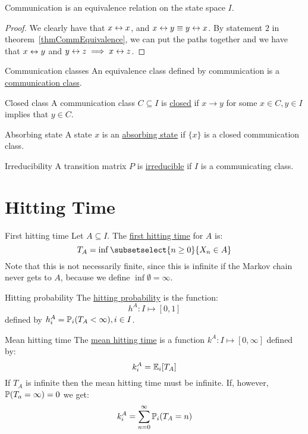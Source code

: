\documentclass[../Main.tex]{subfiles}
\begin{document}
\begin{corollary}
    Communication is an equivalence relation on the state space $I$.
    \label{corCommEquivalence}
\end{corollary}
\begin{proof}
    We clearly have that $x \comms x$, and $x \comms y \equiv y \comms x$. By statement $2$ in theorem~\ref{thmCommEquivalence}, we can put the paths together and we have that $x \comms y$ and $y \comms z \implies x \comms z$.
\end{proof}
\begin{definition}{Communication classes}
    An equivalence class defined by communication is a \underline{communication class}.
\end{definition}
\begin{definition}{Closed class}
    A communication class $C \subseteq I$ is \underline{closed} if $x \to y$ for some $x \in C, y \in I$ implies that $y \in C$.
\end{definition}
\begin{definition}{Absorbing state}
    A state $x$ is an \underline{absorbing state} if $\{x\}$ is a closed communication class.
\end{definition}
\begin{definition}{Irreducibility}
    A transition matrix $P$ is \underline{irreducible} if $I$ is a communicating class.
\end{definition}
\section{Hitting Time}
\begin{definition}{First hitting time}
    Let $A \subseteq I$. The \underline{first hitting time} for $A$ is:
    \begin{equation*}
        T_A = \inf \subsetselect{n \geq 0}{X_n \in A}
    \end{equation*}
    Note that this is not necessarily finite, since this is infinite if the Markov chain never gets to $A$, because we define $\inf \emptyset = \infty$.
\end{definition}
\begin{definition}{Hitting probability}
    The \underline{hitting probability} is the function:
    \begin{equation*}
        h^A : I \mapsto [0, 1]
    \end{equation*}
    defined by $h_i^A = \P_i(T_A < \infty), i \in I$.
\end{definition}
\begin{definition}{Mean hitting time}
    The \underline{mean hitting time} is a function $k^A : I \mapsto [0, \infty]$ defined by:
    \begin{equation*}
        k_i^A = \E_i[T_A]
    \end{equation*}
    If $T_A$ is infinite then the mean hitting time must be infinite. If, however, $\P(T_a = \infty) = 0$ we get:
    \begin{equation*}
        k_i^A = \sum_{n = 0}^\infty \P_i (T_A = n)
    \end{equation*}
\end{definition}
\end{document}

